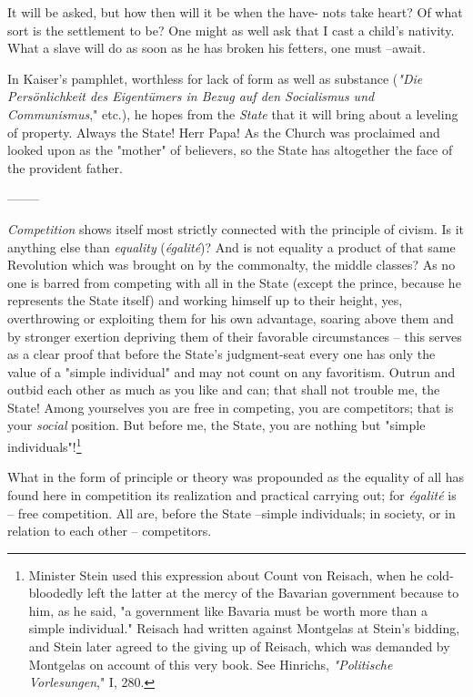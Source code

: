 It will be asked, but how then will it be when the have- nots take heart? Of 
what sort is the settlement to be? One might as well ask that I cast a child's 
nativity. What a slave will do as soon as he has broken his fetters, one must 
--await.

In Kaiser's pamphlet, worthless for lack of form as well as substance 
(\textit{"{}Die Pers\"onlichkeit des Eigent\"umers in Bezug auf den 
Socialismus und Communismus},"{} etc.), he hopes from the \textit{State} that 
it will bring about a leveling of property. Always the State! Herr Papa! As 
the Church was proclaimed and looked upon as the "{}mother"{} of believers, so 
the State has altogether the face of the provident father.

\begin{center}
--------\end{center}


\textit{Competition} shows itself most strictly connected with the principle 
of civism. Is it anything else than \textit{equality} (\textit{\'egalit\'e})? 
And is not equality a product of that same Revolution which was brought on by 
the commonalty, the middle classes? As no one is barred from competing with 
all in the State (except the prince, because he represents the State itself) 
and working himself up to their height, yes, overthrowing or exploiting them 
for his own advantage, soaring above them and by stronger exertion depriving 
them of their favorable circumstances -- this serves as a clear proof that 
before the State's judgment-seat every one has only the value of a "{}simple 
individual"{} and may not count on any favoritism. Outrun and outbid each 
other as much as you like and can; that shall not trouble me, the State! Among 
yourselves you are free in competing, you are competitors; that is your 
\textit{social} position. But before me, the State, you are nothing but 
"{}simple individuals"{}!\footnote{Minister Stein used this expression about 
Count von Reisach, when he cold-bloodedly left the latter at the mercy of the 
Bavarian government because to him, as he said, "{}a government like Bavaria 
must be worth more than a simple individual."{} Reisach had written against 
Montgelas at Stein's bidding, and Stein later agreed to the giving up of 
Reisach, which was demanded by Montgelas on account of this very book. See 
Hinrichs, \textit{"{}Politische Vorlesungen},"{} I, 280.}

What in the form of principle or theory was propounded as the equality of all 
has found here in competition its realization and practical carrying out; for 
\textit{\'egalit\'e} is -- free competition. All are, before the State 
--simple individuals; in society, or in relation to each other -- competitors.

